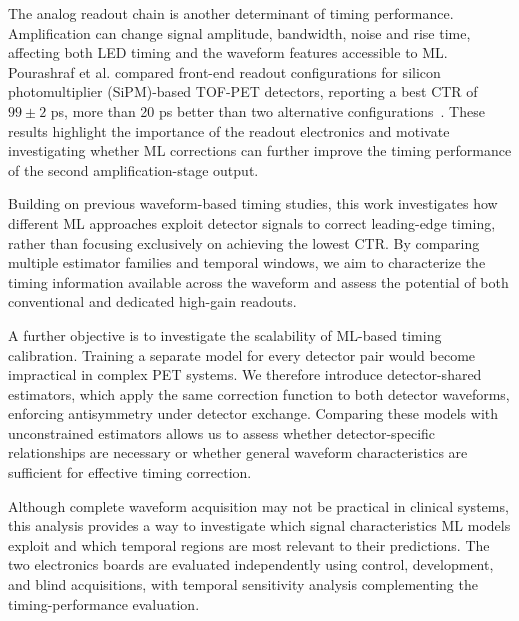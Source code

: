 The analog readout chain is another determinant of timing performance. Amplification can
change signal amplitude, bandwidth, noise and rise time, affecting both LED timing
and the waveform features accessible to ML. Pourashraf et al. compared front-end
readout configurations for silicon photomultiplier (SiPM)-based TOF-PET detectors,
reporting a best CTR of $99 \pm 2$ ps, more than 20 ps better than two alternative
configurations~\cite{pourashraf2022}. 
These results highlight the importance of the readout electronics and motivate 
investigating whether ML corrections can further improve the timing 
performance of the second amplification-stage output.

Building on previous waveform-based timing studies, this work investigates how different 
ML approaches exploit detector signals to correct leading-edge timing, rather than focusing 
exclusively on achieving the lowest CTR. 
By comparing multiple estimator families and temporal windows, we aim to characterize the timing 
information available across the waveform and assess the potential of both conventional and 
dedicated high-gain readouts.

A further objective is to investigate the scalability of ML-based timing calibration. 
Training a separate model for every detector pair would become impractical in complex PET systems. 
We therefore introduce detector-shared estimators, which apply the same correction function to both 
detector waveforms, enforcing antisymmetry under detector exchange. Comparing these models with 
unconstrained estimators allows us to assess whether detector-specific relationships are necessary 
or whether general waveform characteristics are sufficient for effective timing correction.

Although complete waveform acquisition may not be practical in clinical systems, this analysis 
provides a way to investigate which signal characteristics ML models exploit and which temporal 
regions are most relevant to their predictions. The two electronics boards are evaluated 
independently using control, development, and blind acquisitions, with temporal sensitivity 
analysis complementing the timing-performance evaluation.